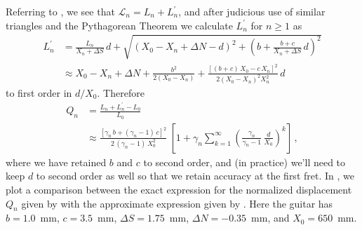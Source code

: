  Referring to , we see that $\mathcal{L}_n = L_n + L^\prime_n$, and after judicious use of similar triangles and the Pythagorean Theorem we calculate $L^\prime_n$ for $n \ge 1$ as
\begin{equation} \label{eqn:l_p_def}
    \begin{split}
        L^\prime_n &= \frac{L_n}{X_n + \Delta S}\, d + \sqrt{\left(X_0 - X_n + \Delta N - d\right)^2 + \left(b + \frac{b + c}{X_n + \Delta S}\, d\right)^2} \\
        &\approx X_0 - X_n + \Delta N + \frac{b^2}{2 \left(X_0 - X_n\right)} + \frac{\left[(b + c)\, X_0 - c\, X_n\right]^2}{2 (X_0 - X_n)^2 X_n^2}\, d
    \end{split}
\end{equation}
to first order in $d/X_0$. Therefore
\begin{equation} \label{eqn:q_n_approx}
  \begin{split}
    Q_n &= \frac{L_n + L_n^\prime - L_0}{L_0} \\
    & \approx \frac{\left[ \gamma_n\, b + (\gamma_n - 1)\, c \right]^2}{2\, (\gamma_n - 1)\, X_0^2} \ \left[ 1 + \gamma_n \sum_{k = 1}^\infty \left(\frac{\gamma_n}{\gamma_n - 1}\, {\frac{d}{X_0}}\right)^k \right]\, ,
  \end{split}
\end{equation}
where we have retained $b$ and $c$ to second order, and (in practice) we'll need to keep $d$ to second order as well so that we retain accuracy at the first fret. In , we plot a comparison between the exact expression for the normalized displacement $Q_n$ given by  with the approximate expression given by . Here the guitar has $b = 1.0$~mm, $c = 3.5$~mm, $\Delta S = 1.75$~mm, $\Delta N = -0.35$~mm, and $X_0 = 650$~mm.

